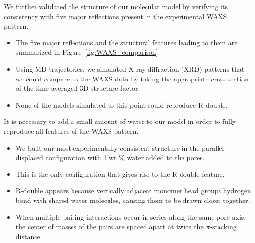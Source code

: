 \documentclass{article}
\begin{document}

  \noindent We further validated the structure of our molecular model by 
  verifying its consistency with five major reflections present in the 
  experimental WAXS pattern.
  \begin{itemize}
    \item The five major reflections and the structural features leading
    to them are summarized in Figure~\ref{fig:WAXS_comparison}.
    \item Using MD trajectories, we simulated X-ray diffraction (XRD) 
    patterns that we could compare to the WAXS data by taking the 
    appropriate cross-section of the time-averaged 3D structure factor. 
    \item None of the models simulated to this point could reproduce R-double.   
  \end{itemize}   
  
  \noindent It is necessary to add a small amount of water to our model in
  order to fully reproduce all features of the WAXS pattern.
  \begin{itemize}
    \item We built our most experimentally consistent structure in the 
    parallel displaced configuration with 1 wt \% water added to the 
    pores. 
    \item This is the only configuration that gives rise to the 
    R-double feature. 
    \item R-double appears because vertically adjacent monomer head groups
    hydrogen bond with shared water molecules, causing them to be drawn 
    closer together.
    \item When multiple pairing interactions occur in series along the 
    same pore axis, the center of masses of the pairs are spaced apart at 
    twice the $\pi$-stacking distance. 
  \end{itemize}
  
\end{document}
